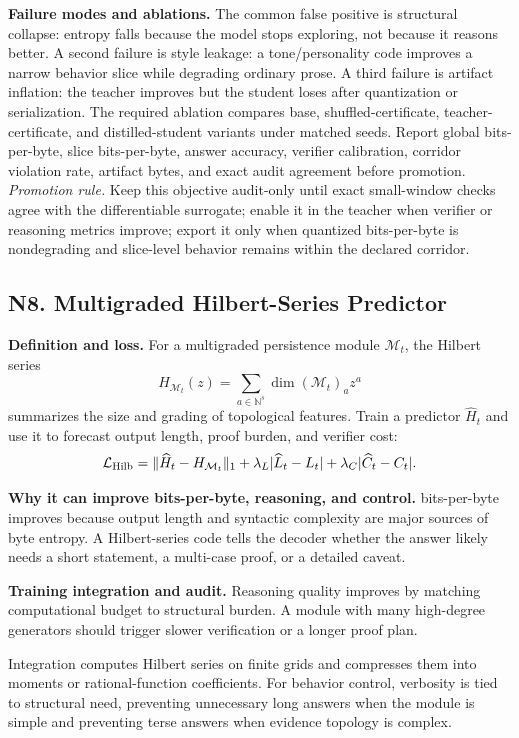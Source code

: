 \documentclass[10pt]{article}
\newcommand{\NN}{\mathbb{N}}
\newcommand{\calM}{\mathcal{M}}
\newcommand{\loss}{\mathcal{L}}
\numberwithin{equation}{section}
\begin{document}
\noindent\textbf{Failure modes and ablations.} The common false positive is structural collapse: entropy falls because the model stops exploring, not because it reasons better. A second failure is style leakage: a tone/personality code improves a narrow behavior slice while degrading ordinary prose. A third failure is artifact inflation: the teacher improves but the student loses after quantization or serialization. The required ablation compares base, shuffled-certificate, teacher-certificate, and distilled-student variants under matched seeds. Report global bits-per-byte, slice bits-per-byte, answer accuracy, verifier calibration, corridor violation rate, artifact bytes, and exact audit agreement before promotion.
\vfill
\noindent\emph{Promotion rule.} Keep this objective audit-only until exact small-window checks agree with the differentiable surrogate; enable it in the teacher when verifier or reasoning metrics improve; export it only when quantized bits-per-byte is nondegrading and slice-level behavior remains within the declared corridor.
\clearpage
\subsection{N8. Multigraded Hilbert-Series Predictor}
\noindent\textbf{Definition and loss.} For a multigraded persistence module $\calM_t$, the Hilbert series
\[
H_{\calM_t}(z)=\sum_{a\in\NN^s}\dim (\calM_t)_a z^a
\]
summarizes the size and grading of topological features. Train a predictor $\widehat H_t$ and use it to forecast output length, proof burden, and verifier cost:
\[
\loss_{\rm Hilb}=\|\widehat H_t-H_{\calM_t}\|_1+\lambda_L|\widehat L_t-L_t|+\lambda_C|\widehat C_t-C_t|.
\]

\noindent\textbf{Why it can improve bits-per-byte, reasoning, and control.} bits-per-byte improves because output length and syntactic complexity are major sources of byte entropy. A Hilbert-series code tells the decoder whether the answer likely needs a short statement, a multi-case proof, or a detailed caveat.

\noindent\textbf{Training integration and audit.} Reasoning quality improves by matching computational budget to structural burden. A module with many high-degree generators should trigger slower verification or a longer proof plan.

Integration computes Hilbert series on finite grids and compresses them into moments or rational-function coefficients. For behavior control, verbosity is tied to structural need, preventing unnecessary long answers when the module is simple and preventing terse answers when evidence topology is complex.
\end{document}
